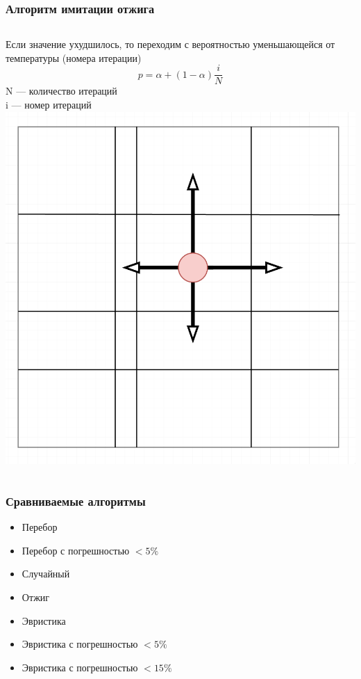 \documentclass{beamer}
\begin{document}
\begin{frame}
\frametitle{Алгоритм имитации отжига}
\begin{columns}
    Если значение ухудшилось, то переходим с вероятностью уменьшающейся от температуры (номера итерации)
    \[
    p=\alpha + (1 - \alpha) \frac{i}{N}
    \]
    N --- количество итераций\\
    i --- номер итераций
    \includegraphics[width=\textwidth]{gena_move.png}
\end{columns}
\end{frame}

\begin{frame}
    \frametitle{Сравниваемые алгоритмы}
    \begin{itemize}
            \item Перебор
            \item Перебор с погрешностью $<5\%$
            \item Случайный
            \item Отжиг
            \item Эвристика
            \item Эвристика с погрешностью $<5\%$
            \item Эвристика с погрешностью $<15\%$
    \end{itemize}
\end{frame}
\end{document}
